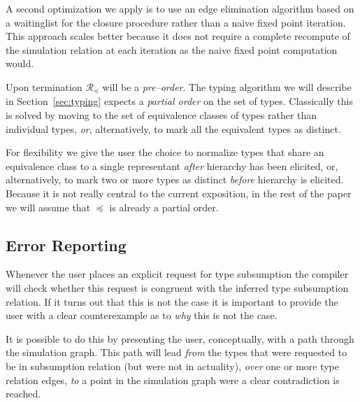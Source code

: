 \documentclass{sigplanconf}
\newcommand{\mc}[1]{\mathcal{#1}}
\begin{document}
A second optimization we apply is to use an edge elimination
algorithm based on a waitinglist for the closure procedure rather than
a naive fixed point iteration. This approach scales better because it
does not require a complete recompute of the simulation relation at
each iteration as the naive fixed point computation would.

Upon termination $\mc{R}_\preceq$ will be a \emph{pre--order}. The
typing algorithm we will describe in Section~\ref{sec:typing} expects
a \emph{partial order} on the set of types. Classically this is solved
by moving to the set of equivalence classes of types rather than
individual types, \emph{or}, alternatively, to mark all the equivalent
types as distinct.

For flexibility we give the user the choice to normalize types that
share an equivalence class to a single representant \emph{after}
hierarchy has been elicited, or, alternatively, to mark two or more
types as distinct \emph{before} hierarchy is elicited. Because it is
not really central to the current exposition, in the rest of the paper
we will assume that $\preceq$ is already a partial order.

\subsection{Error Reporting}

Whenever the user places an explicit request
for type subsumption the compiler will check whether this request is
congruent with the inferred type subsumption relation. If it turns out
that this is not the case it is important to provide the user with a
clear counterexample as to \emph{why} this is not the case. 

It is possible to do this by presenting the user, conceptually, with a
path through the simulation graph. This path will lead \emph{from} the
types that were requested to be in subsumption relation (but were not
in actuality), \emph{over} one or more type relation edges, \emph{to}
a point in the simulation graph were a clear contradiction is reached.
\end{document}
